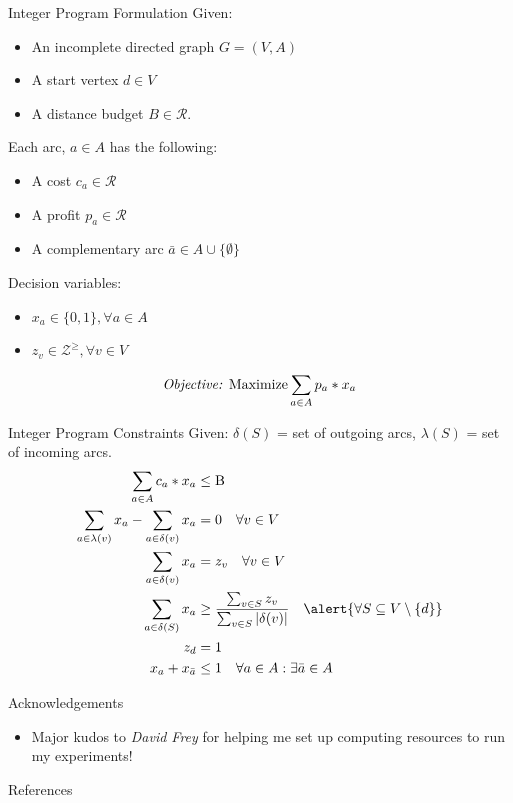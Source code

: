 \documentclass{beamer}
\newcommand{\RR}{\mathcal{R}} %
\newcommand{\ZZ}{\mathcal{Z}} %
\newcommand{\set}[1]{\ensuremath{\{{#1}\}}} %
\newcommand{\sse}{\subseteq} %
\begin{document}
\begin{frame}{Integer Program Formulation \cite{verbeeck2014extension}}
Given:
\begin{itemize}
    \item An incomplete directed graph $G = (V,A)$
    \item A start vertex $d \in V$
    \item A distance budget $B \in \RR$.
\end{itemize}
Each arc, $a \in A$ has the following:
\begin{itemize}
    \item A cost $c_a \in \RR$
    \item A profit $p_a \in \RR$
    \item A complementary arc $\bar{a} \in A  \cup \set{\emptyset}$
\end{itemize} 

Decision variables:
\begin{itemize}
    \item $x_a \in \set{0,1},  \forall a \in A$
    \item $z_v \in \ZZ^{\geq}, \forall v \in V$
\end{itemize}
\begin{equation}
    \text{\emph{Objective:} Maximize} \sum_{a \in A}{p_a * x_a}    
\end{equation}
\end{frame}

\begin{frame}{Integer Program Constraints}
Given: $\delta(S)$ = set of outgoing arcs, $\lambda(S)$ = set of incoming arcs.
\begin{align}
    \sum_{a \in A}{c_a * x_a} &\leq \text{B}\\
    \sum_{a \in \lambda(v)}{x_a}  -\sum_{a \in \delta(v)}{x_a} &= 0 \quad \forall v \in V\\
    \sum_{a \in \delta(v)}{x_a} &= z_v \quad\forall v \in V\\
    \sum_{a \in \delta(S)}{x_a} &\geq \frac{\sum_{v \in S}{z_v}}{\sum_{v \in S}{|\delta(v)|}} \quad \alert{\forall S \sse V \setminus \set{d}}\\
    z_d &= 1\\
    x_a + x_{\bar{a}} &\leq 1 \quad \forall a \in A: \exists\bar{a} \in A
\end{align} 
\end{frame}


\begin{frame}{Acknowledgements}
\begin{itemize}
    \item Major kudos to \emph{David Frey} for helping me set up computing resources to run my experiments!
\end{itemize}
\end{frame}

\begin{frame}{References}
    \nocite{*}
    \scriptsize
    
    
\end{frame}
\end{document}
